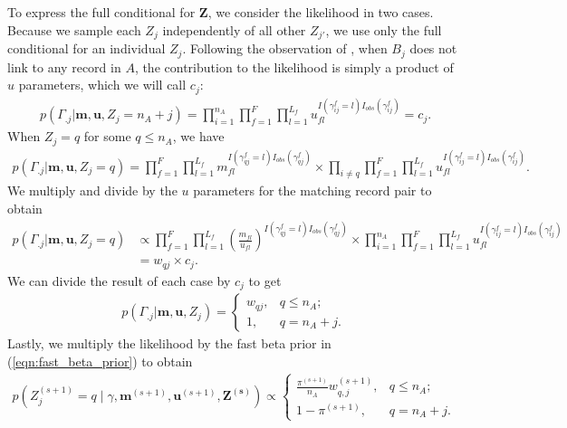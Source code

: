 \documentclass[ba]{imsart}
\begin{document}
To express the full conditional for $\bm{Z}$, we consider the likelihood in two cases. Because we sample each $Z_j$ independently of all other $Z_{j'}$, we use only the full conditional for an individual $Z_j$. Following the observation of \cite{wortman2019}, when $B_j$ does not link to any record in $A$, the contribution to the likelihood is simply a product of $u$ parameters, which we will call $c_j$:
\begin{align}
	p(\Gamma_{.j}| \bm{m}, \bm{u}, Z_j = n_A + j) = \prod_{i=1}^{n_A}\prod_{f=1}^{F}\prod_{l=1}^{L_f} u_{fl}^{I(\gamma_{ij}^f = l)I_{obs}(\gamma_{ij}^f)} = c_j.
\end{align}
When $Z_j = q$ for some $q\leq n_A$, we have
\begin{align}
	p(\Gamma_{.j}| \bm{m}, \bm{u}, Z_j = q) =\prod_{f=1}^{F}\prod_{l=1}^{L_f} m_{fl}^{I(\gamma_{qj}^f = l)I_{obs}(\gamma_{qj}^f)} \times \prod_{i \neq q}\prod_{f=1}^{F}\prod_{l=1}^{L_f} u_{fl}^{I(\gamma_{ij}^f = l)I_{obs}(\gamma_{ij}^f)}.
\end{align}
We multiply and divide by the $u$ parameters for the matching record pair to obtain
\begin{align}
	p(\Gamma_{.j}| \bm{m}, \bm{u}, Z_j = q) &\propto \prod_{f=1}^{F}\prod_{l=1}^{L_f} \left(\frac{m_{fl}}{u_{fl}}\right)^{I(\gamma_{qj}^f = l)I_{obs}(\gamma_{qj}^f)} \times \prod_{i = 1}^{n_A}\prod_{f=1}^{F}\prod_{l=1}^{L_f} u_{fl}^{I(\gamma_{ij}^f = l)I_{obs}(\gamma_{ij}^f)} \\
	&= w_{qj} \times c_j.
\end{align}
We can divide the result of each case by $c_j$ to get
\begin{align}
	p(\Gamma_{.j}| \bm{m}, \bm{u}, Z_j) = \begin{cases} 
		w_{qj}, & q \leq n_A; \\
		1, &  q  = n_A + j. \
	\end{cases}
\end{align}
Lastly, we multiply the likelihood by the fast beta prior in (\ref{eqn:fast_beta_prior}) to obtain
\begin{align}
	\label{eqn:z_full_conditional2}
	p\left(Z_j^{(s+1)}  = q \mid \gamma, \bm{m}^{(s+1)}, \bm{u}^{(s+1)}, \bm{Z^{(s)}}\right) \propto
	\begin{cases} 
		\frac{\pi^{(s+1)}}{n_A} w_{q, j}^{(s+1)},  & q \leq n_A; \\
		1 - \pi^{(s+1)}, & q  = n_A + j. \
	\end{cases}
\end{align}
\end{document}
